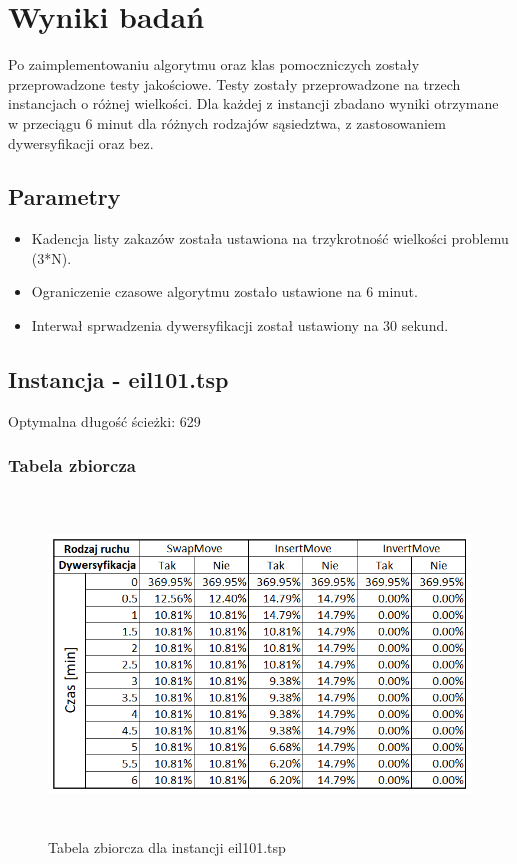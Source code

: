 \documentclass[a4paper,11pt]{article}
\begin{document}
\section{Wyniki badań}

Po zaimplementowaniu algorytmu oraz klas pomoczniczych zostały przeprowadzone testy jakościowe. Testy zostały przeprowadzone na trzech instancjach o różnej wielkości. Dla każdej z instancji zbadano wyniki otrzymane w przeciągu 6 minut dla różnych rodzajów sąsiedztwa, z zastosowaniem dywersyfikacji oraz bez. 

\subsection{Parametry}

\begin{itemize}
\item Kadencja listy zakazów została ustawiona na trzykrotność wielkości problemu (3*N).
\item Ograniczenie czasowe algorytmu zostało ustawione na 6 minut.
\item Interwał sprwadzenia dywersyfikacji został ustawiony na 30 sekund.
\end{itemize}

\newpage
\subsection{Instancja - eil101.tsp}

Optymalna długość ścieżki: 629

\subsubsection{Tabela zbiorcza}

\begin{figure}[H]
\centering
\includegraphics[height=9cm]{101.PNG}
\caption{Tabela zbiorcza dla instancji eil101.tsp}
\end{figure}
\end{document}
